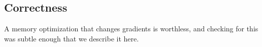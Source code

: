 \documentclass[10pt]{article}
\begin{document}
\begin{table}[t]
\centering
\small
\caption{Work done by the use-site pass at the low budgets: predicted backward peak before and after (MB, static walk),
accepted rematerializations, added work per step in units of $10^9$ (a normalized proxy, not FLOPs: exact FLOPs for matrix
multiplies, one unit per output element for every other op; neither mode duplicates attention, \cref{sec:remat}; step
time in \cref{tab:main} is the measured cost), and pass time (s, Python, unoptimized).}
\label{tab:pass}

\end{table}

\subsection{Correctness}
\label{sec:correctness}
A memory optimization that changes gradients is worthless, and checking for this was subtle enough that we describe it here.
\end{document}
